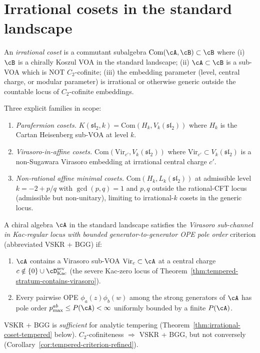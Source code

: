 \section{Irrational cosets in the standard landscape}
\label{sec:irrational-cosets-definitions}

\begin{definition}
\label{def:irrational-coset-standard-landscape}
An \emph{irrational coset} is a commutant subalgebra
$\mathrm{Com}(\cA, \cB) \subset \cB$ where (i) $\cB$ is a chirally
Koszul VOA in the standard landscape; (ii) $\cA \subset \cB$ is a
sub-VOA which is NOT $C_2$-cofinite; (iii) the embedding parameter
(level, central charge, or modular parameter) is irrational or
otherwise generic outside the countable locus of $C_2$-cofinite
embeddings.

Three explicit families in scope:
\begin{enumerate}[nosep]
\item \emph{Parafermion cosets.}
 $K(\mathfrak{sl}_2, k)
 = \mathrm{Com}(H_k, V_k(\mathfrak{sl}_2))$
 where $H_k$ is the Cartan Heisenberg sub-VOA at level $k$.
\item \emph{Virasoro-in-affine cosets.}
 $\mathrm{Com}(\mathrm{Vir}_{c'}, V_k(\mathfrak{sl}_2))$ where
 $\mathrm{Vir}_{c'} \subset V_k(\mathfrak{sl}_2)$ is a non-Sugawara
 Virasoro embedding at irrational central charge $c'$.
\item \emph{Non-rational affine minimal cosets.}
 $\mathrm{Com}(H_k, L_k(\mathfrak{sl}_2))$ at admissible level
 $k = -2 + p/q$ with $\gcd(p, q) = 1$ and $p, q$ outside the
 rational-CFT locus (admissible but non-unitary), limiting to
 irrational-$k$ cosets in the generic locus.
\end{enumerate}
\end{definition}

\begin{definition}
\label{def:vskr-bgg-criterion}
A chiral algebra $\cA$ in the standard landscape satisfies the
\emph{Virasoro sub-channel in Kac-regular locus with bounded
generator-to-generator OPE pole order} criterion (abbreviated
VSKR + BGG) if:
\begin{enumerate}[nosep]
\item[(VSKR)] $\cA$ contains a Virasoro sub-VOA
 $\mathrm{Vir}_c \subset \cA$ at a central charge
 $c \notin \{0\} \cup \cD^{\mathrm{sev}}_{\mathrm{Kac}}$ (the
 severe Kac-zero locus of
 Theorem~\ref{thm:tempered-stratum-contains-virasoro}).
\item[(BGG)] Every pairwise OPE
 $\phi_a(z) \phi_b(w)$ among the strong generators of $\cA$ has
 pole order $p_{\max}^{ab} \le P(\cA) < \infty$ uniformly bounded
 by a finite $P(\cA)$.
\end{enumerate}
VSKR + BGG is \emph{sufficient} for analytic tempering
(Theorem~\ref{thm:irrational-coset-tempered} below).
$C_2$-cofiniteness $\Longrightarrow$ VSKR + BGG, but not conversely
(Corollary~\ref{cor:tempered-criterion-refined}).
\end{definition}

